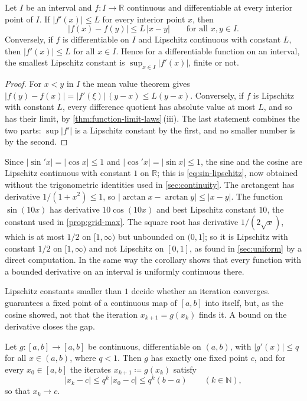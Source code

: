 \begin{corollary}
\label{cor:lipschitz-derivative}
Let $I$ be an interval and $f\colon I\to\mathbb R$ continuous and differentiable at every interior point of $I$. If $|f'(x)|\le L$ for every interior point $x$, then
\[
|f(x)-f(y)|\le L\,|x-y|\qquad\text{for all }x,y\in I .
\]
Conversely, if $f$ is differentiable on $I$ and Lipschitz continuous with constant $L$, then $|f'(x)|\le L$ for all $x\in I$. Hence for a differentiable function on an interval, the smallest Lipschitz constant is $\sup_{x\in I}|f'(x)|$, finite or not.
\end{corollary}

\begin{proof}
For $x<y$ in $I$ the mean value theorem gives $|f(y)-f(x)|=|f'(\xi)|\,(y-x)\le L(y-x)$. Conversely, if $f$ is Lipschitz with constant $L$, every difference quotient has absolute value at most $L$, and so has their limit, by \cref{thm:function-limit-laws}\,(iii). The last statement combines the two parts: $\sup|f'|$ is a Lipschitz constant by the first, and no smaller number is by the second.
\end{proof}

Since $|\sin'x|=|\cos x|\le1$ and $|\cos'x|=|\sin x|\le1$, the sine and the cosine are Lipschitz continuous with constant $1$ on $\mathbb R$; this is \eqref{eq:sin-lipschitz}, now obtained without the trigonometric identities used in \cref{sec:continuity}. The arctangent has derivative $1/(1+x^2)\le1$, so $|\arctan x-\arctan y|\le|x-y|$. The function $\sin(10x)$ has derivative $10\cos(10x)$ and best Lipschitz constant $10$, the constant used in \cref{prop:grid-max}. The square root has derivative $1/(2\sqrt x)$, which is at most $1/2$ on $[1,\infty)$ but unbounded on $(0,1]$; so it is Lipschitz with constant $1/2$ on $[1,\infty)$ and not Lipschitz on $[0,1]$, as found in \cref{sec:uniform} by a direct computation. In the same way the corollary shows that every function with a bounded derivative on an interval is uniformly continuous there.

Lipschitz constants smaller than $1$ decide whether an iteration converges.  guarantees a fixed point of a continuous map of $[a,b]$ into itself, but, as the cosine showed, not that the iteration $x_{k+1}=g(x_k)$ finds it. A bound on the derivative closes the gap.

\begin{proposition}
\label{prop:fixed-point-contraction}
Let $g\colon[a,b]\to[a,b]$ be continuous, differentiable on $(a,b)$, with $|g'(x)|\le q$ for all $x\in(a,b)$, where $q<1$. Then $g$ has exactly one fixed point $c$, and for every $x_0\in[a,b]$ the iterates $x_{k+1}\coloneqq g(x_k)$ satisfy
\[
|x_k-c|\le q^k\,|x_0-c|\le q^k(b-a)\qquad(k\in\mathbb N),
\]
so that $x_k\to c$.
\end{proposition}

